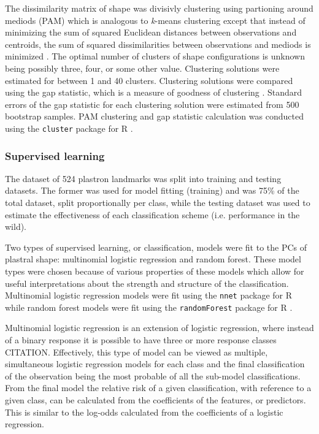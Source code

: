 \documentclass[12pt]{article}\usepackage{graphicx, color}
\begin{document}
The dissimilarity matrix of shape was divisivly clustering using partioning around mediods (PAM) which is analogous to \textit{k}-means clustering except that instead of minimizing the sum of squared Euclidean distances between observations and centroids, the sum of squared dissimilarities between observations and mediods is minimized \citep{Kaufman1990}.
The optimal number of clusters of shape configurations is unknown being possibly three, four, or some other value. Clustering solutions were estimated for between 1 and 40 clusters. Clustering solutions were compared using the gap statistic, which is a measure of goodness of clustering \citep{Tibshirani2001a}. Standard errors of the gap statistic for each clustering solution were estimated from 500 bootstrap samples.
PAM clustering and gap statistic calculation was conducted using the \texttt{cluster} package for R \citep{Maechler2013}.

\subsubsection{Supervised learning}
The dataset of 524 plastron landmarks was split into training and testing datasets. The former was used for model fitting (training) and was 75\% of the total dataset, split proportionally per class, while the testing dataset was used to estimate the effectiveness of each classification scheme (i.e. performance in the wild).

Two types of supervised learning, or classification, models were fit to the PCs of plastral shape: multinomial logistic regression and random forest. These model types were chosen because of various properties of these models which allow for useful interpretations about the strength and structure of the classification. Multinomial logistic regression models were fit using the \texttt{nnet} package for R \citep{Venables2002} while random forest models were fit using the \texttt{randomForest} package for R \citep{Liaw2002}.

Multinomial logistic regression is an extension of logistic regression, where instead of a binary response it is possible to have three or more response classes CITATION. Effectively, this type of model can be viewed as multiple, simultaneous logistic regression models for each class and the final classification of the observation being the most probable of all the sub-model classifications. From the final model the relative risk of a given classification, with reference to a given class, can be calculated from the coefficients of the features, or predictors. This is similar to the log-odds calculated from the coefficients of a logistic regression.
\end{document}
